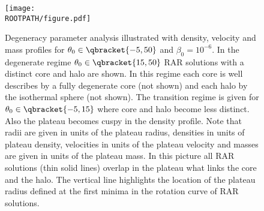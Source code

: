 \begin{figure}%
	\centering%
	\texttt{[image: \\ROOTPATH/figure.pdf]}
	\caption{Degeneracy parameter analysis illustrated with density, velocity and mass profiles for $\theta_0\in\qbracket{-5,50}$ and $\beta_0 = 10^{-6}$. In the degenerate regime $\theta_0\in\qbracket{15,50}$ RAR solutions with a distinct core and halo are shown. In this regime each core is well describes by a fully degenerate core (not shown) and each halo by the isothermal sphere (not shown). The transition regime is given for $\theta_0\in\qbracket{-5,15}$ where core and halo become less distinct. Also the plateau becomes cuspy in the density profile. Note that radii are given in units of the plateau radius, densities in units of plateau density, velocities in units of the plateau velocity and masses are given in units of the plateau mass. In this picture all RAR solutions (thin solid lines) overlap in the plateau what links the core and the halo. The vertical line highlights the location of the plateau radius defined at the first minima in the rotation curve of RAR solutions.}%
	\label{fig:profiles:without-cutoff:central-degeneracy:plateau}%
\end{figure}
